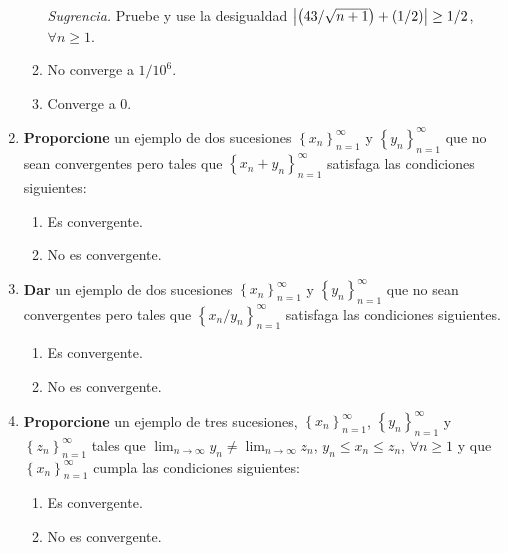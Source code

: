 \documentclass[12pt]{article}
\begin{document}
\begin{enumerate}
\begin{enumerate}
                \textit{Sugrencia.} Pruebe y use la desigualdad $\left| \left(43/\sqrt{n+1}\right)+\left(1/2\right) \right|\geq 1/2$, $\forall n\geq1$.
            \item No converge a $1/10^6$.
            \item Converge a 0.
        \end{enumerate}
    \item \textbf{Proporcione} un ejemplo de dos sucesiones $\left\{x_n\right\}_{n=1}^{\infty}$ y $\left\{y_n\right\}_{n=1}^{\infty}$ que no sean convergentes pero tales que $\left\{x_n+y_n\right\}_{n=1}^{\infty}$ satisfaga las condiciones siguientes:
        \begin{multicols}{2}
            \begin{enumerate}
                \item Es convergente.
                \item No es convergente.
            \end{enumerate}
        \end{multicols}
    \item \textbf{Dar} un ejemplo de dos sucesiones $\left\{x_n\right\}_{n=1}^{\infty}$ y $\left\{y_n\right\}_{n=1}^{\infty}$ que no sean convergentes pero tales que $\left\{x_n/y_n\right\}_{n=1}^{\infty}$ satisfaga las condiciones siguientes.
        \begin{multicols}{2}
            \begin{enumerate}
                \item Es convergente.
                \item No es convergente.
            \end{enumerate}
        \end{multicols}
    \item \textbf{Proporcione} un ejemplo de tres sucesiones, $\left\{x_n\right\}_{n=1}^{\infty}$, $\left\{y_n\right\}_{n=1}^{\infty}$ y $\left\{z_n\right\}_{n=1}^{\infty}$ tales que $\lim_{n\rightarrow\infty}y_n\neq\lim_{n\rightarrow\infty}z_n$, $y_n\leq x_n\leq z_n$, $\forall n\geq1$ y que $\left\{x_n\right\}_{n=1}^{\infty}$ cumpla las condiciones siguientes:
        \begin{multicols}{2}
            \begin{enumerate}
                \item Es convergente.
                \item No es convergente.
            \end{enumerate}
        \end{multicols}

\end{enumerate}
\end{document}
